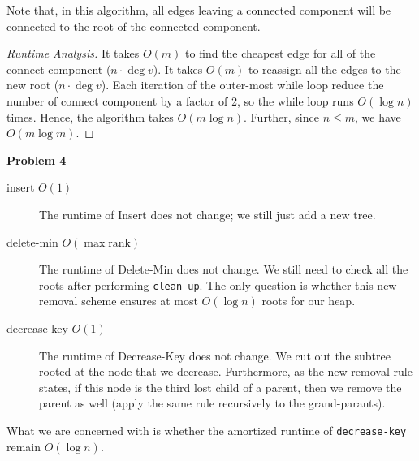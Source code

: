 \documentclass[a4paper]{/Users/dawei/.dotfiles/templates/preamble}
\begin{document}
\begin{enumerate}[label = (\alph*)]
\begin{algorithmic}
        \EndFor{}
           
        \EndFor{}
      \EndWhile{}
    \end{algorithmic}
    Note that, in this algorithm, all edges leaving a connected component will be
    connected to the root of the connected component.
    \begin{proof}[Runtime Analysis]{}
      It takes $O(m)$ to find the cheapest edge for all of the connect
      component ($n \cdot \deg{v}$). It takes $O(m)$ to reassign all the edges
      to the new root ($n \cdot \deg{v}$). Each iteration of the outer-most
      while loop reduce the number of connect component by a factor of 2, so
      the while loop runs $O(\log{n})$ times. Hence, the algorithm takes $O(m
      \log{n})$. Further, since $n \le m$, we have $O(m \log{m})$.
    \end{proof}
\end{enumerate}

\noindent\textbf{Problem 4}
\begin{description}
  \item[insert $O(1)$] The runtime of Insert does not change; we still just add
    a new tree.
  \item[delete-min $O(\max{\mathrm{rank}})$] The runtime of Delete-Min does not
    change. We still need to check all the roots after performing
    \texttt{clean-up}. The only question is whether this new removal scheme
    ensures at most $O(\log n)$ roots for our heap.
  \item[decrease-key $O(1)$] The runtime of Decrease-Key does not change. We
    cut out the subtree rooted at the node that we decrease. Furthermore, as
    the new removal rule states, if this node is the third lost child of
    a parent, then we remove the parent as well (apply the same rule
    recursively to the grand-parants).
\end{description}
What we are concerned with is whether the amortized runtime of
\texttt{decrease-key} remain $O(\log n)$.
\end{document}
